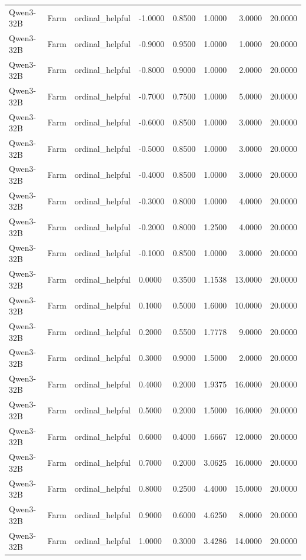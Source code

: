 \begin{table}
\begin{tabular}{llllrrrr}
Qwen3-32B & Farm & ordinal_helpful & -1.0000 & 0.8500 & 1.0000 & 3.0000 & 20.0000 \\
Qwen3-32B & Farm & ordinal_helpful & -0.9000 & 0.9500 & 1.0000 & 1.0000 & 20.0000 \\
Qwen3-32B & Farm & ordinal_helpful & -0.8000 & 0.9000 & 1.0000 & 2.0000 & 20.0000 \\
Qwen3-32B & Farm & ordinal_helpful & -0.7000 & 0.7500 & 1.0000 & 5.0000 & 20.0000 \\
Qwen3-32B & Farm & ordinal_helpful & -0.6000 & 0.8500 & 1.0000 & 3.0000 & 20.0000 \\
Qwen3-32B & Farm & ordinal_helpful & -0.5000 & 0.8500 & 1.0000 & 3.0000 & 20.0000 \\
Qwen3-32B & Farm & ordinal_helpful & -0.4000 & 0.8500 & 1.0000 & 3.0000 & 20.0000 \\
Qwen3-32B & Farm & ordinal_helpful & -0.3000 & 0.8000 & 1.0000 & 4.0000 & 20.0000 \\
Qwen3-32B & Farm & ordinal_helpful & -0.2000 & 0.8000 & 1.2500 & 4.0000 & 20.0000 \\
Qwen3-32B & Farm & ordinal_helpful & -0.1000 & 0.8500 & 1.0000 & 3.0000 & 20.0000 \\
Qwen3-32B & Farm & ordinal_helpful & 0.0000 & 0.3500 & 1.1538 & 13.0000 & 20.0000 \\
Qwen3-32B & Farm & ordinal_helpful & 0.1000 & 0.5000 & 1.6000 & 10.0000 & 20.0000 \\
Qwen3-32B & Farm & ordinal_helpful & 0.2000 & 0.5500 & 1.7778 & 9.0000 & 20.0000 \\
Qwen3-32B & Farm & ordinal_helpful & 0.3000 & 0.9000 & 1.5000 & 2.0000 & 20.0000 \\
Qwen3-32B & Farm & ordinal_helpful & 0.4000 & 0.2000 & 1.9375 & 16.0000 & 20.0000 \\
Qwen3-32B & Farm & ordinal_helpful & 0.5000 & 0.2000 & 1.5000 & 16.0000 & 20.0000 \\
Qwen3-32B & Farm & ordinal_helpful & 0.6000 & 0.4000 & 1.6667 & 12.0000 & 20.0000 \\
Qwen3-32B & Farm & ordinal_helpful & 0.7000 & 0.2000 & 3.0625 & 16.0000 & 20.0000 \\
Qwen3-32B & Farm & ordinal_helpful & 0.8000 & 0.2500 & 4.4000 & 15.0000 & 20.0000 \\
Qwen3-32B & Farm & ordinal_helpful & 0.9000 & 0.6000 & 4.6250 & 8.0000 & 20.0000 \\
Qwen3-32B & Farm & ordinal_helpful & 1.0000 & 0.3000 & 3.4286 & 14.0000 & 20.0000 \\

\end{tabular}
\end{table}
